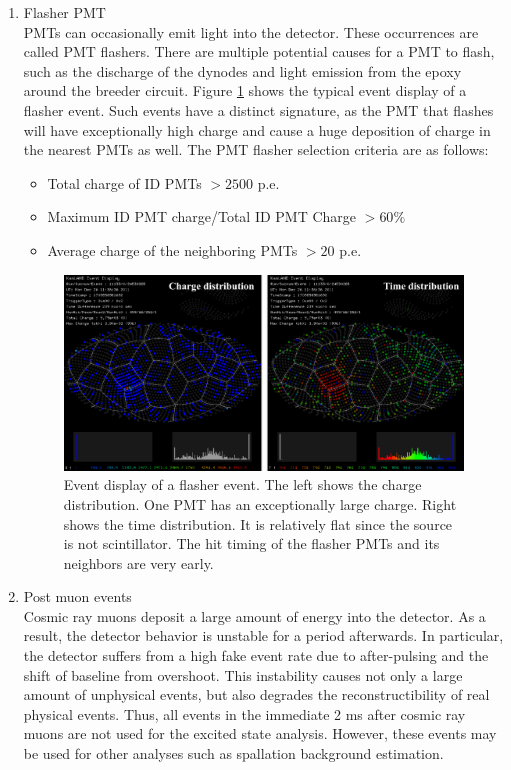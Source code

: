 \begin{enumerate}
	\item Flasher PMT \\
	PMTs can occasionally emit light into the detector. These occurrences are called PMT flashers. There are multiple potential causes for a PMT to flash, such as the discharge of the dynodes and light emission from the epoxy around the breeder circuit. Figure \ref{fig:flasher} shows the typical event display of a flasher event. Such events have a distinct signature, as the PMT that flashes will have exceptionally high charge and cause a huge deposition of charge in the nearest PMTs as well. The PMT flasher selection criteria are as follows:
	\begin{itemize}
		\item Total charge of ID PMTs $ > 2500$ p.e.
		\item Maximum ID PMT charge/Total ID PMT Charge $ >60\%$
		\item Average charge of the neighboring PMTs $ > 20$ p.e.
	\end{itemize}
	\begin{figure}[htb!]
		\centering
        \includegraphics[scale=0.45]{flasher.png}
        \caption{Event display of a flasher event. The left shows the charge distribution. One PMT has an exceptionally large charge. Right shows the time distribution. It is relatively flat since the source is not scintillator. The hit timing of the flasher PMTs and its neighbors are very early.}
        \label{fig:flasher}
	\end{figure}
	\item Post muon events \\
	Cosmic ray muons deposit a large amount of energy into the detector. As a result, the detector behavior is unstable for a period afterwards. In particular, the detector suffers from a high fake event rate due to after-pulsing and the shift of baseline from overshoot. This instability causes not only a large amount of unphysical events, but also degrades the reconstructibility of real physical events. Thus, all events in the immediate 2 ms after cosmic ray muons are not used for the excited state analysis. However, these events may be used for other analyses such as spallation background estimation.

\end{enumerate}
